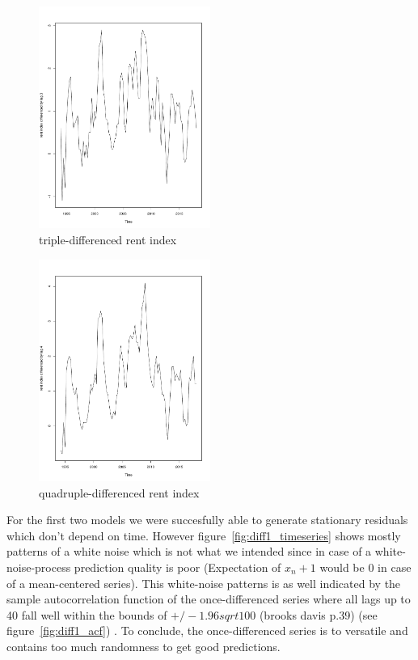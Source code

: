 \documentclass[11pt,a4paper]{article}
\begin{document}
\begin{figure}[!htb]
\centering
\includegraphics[angle=0,
width=0.5\textwidth]{diff3_timeseries}
\caption{triple-differenced rent index
\label{fig:diff3_timeseries}}
\end{figure}
\begin{figure}[!htb]
\centering
\includegraphics[angle=0,
width=0.5\textwidth]{diff4_timeseries}
\caption{quadruple-differenced rent index
\label{fig:diff4_timeseries}}
\end{figure}
For the first two models we were succesfully able to generate stationary residuals which don't depend on time. However figure~\ref{fig:diff1_timeseries} shows mostly patterns of a white noise which is not what we intended since in case of a white-noise-process prediction quality is poor (Expectation of $x_n+1$ would be 0 in case of a mean-centered series). This white-noise patterns is as well indicated by the sample autocorrelation function of the once-differenced series where all lags up to 40 fall well within the bounds of $+/-1.96sqrt{100}$ (brooks davis p.39)  (see figure~\ref{fig:diff1_acf}) . To conclude, the once-differenced series is to versatile and contains too much randomness to get good predictions.
\end{document}
